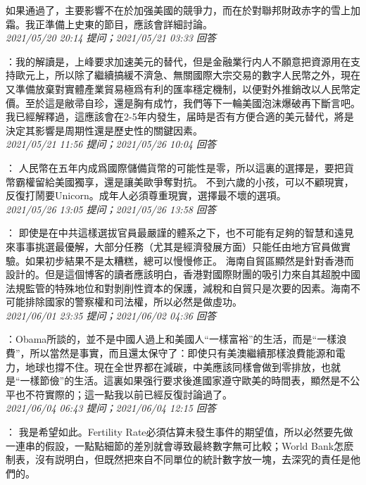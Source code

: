 \documentclass[twocolumn]{ctexart}
\begin{document}
如果通過了，主要影響不在於加强美國的競爭力，而在於對聯邦財政赤字的雪上加霜。我正準備上史東的節目，應該會詳細討論。
\\

\textit{\hfill\noindent\small 2021/05/20 20:14 提问；2021/05/21 03:33 回答}

：我的解讀是，上峰要求加速美元的替代，但是金融業行内人不願意把資源用在支持歐元上，所以除了繼續搞緩不濟急、無關國際大宗交易的數字人民幣之外，現在又準備放棄對實體產業貿易極爲有利的匯率穩定機制，以便對外推銷改以人民幣定價。至於這是敝帚自珍，還是胸有成竹，我們等下一輪美國泡沫爆破再下斷言吧。我已經解釋過，這應該會在2-5年内發生，届時是否有方便合適的美元替代，將是決定其影響是周期性還是歷史性的關鍵因素。
\\

\textit{\hfill\noindent\small 2021/05/21 11:56 提问；2021/05/26 10:04 回答}

：
人民幣在五年内成爲國際儲備貨幣的可能性是零，所以這裏的選擇是，要把貨幣霸權留給美國獨享，還是讓美歐爭奪對抗。
不到六歲的小孩，可以不顧現實，反復打鬧要Unicorn。成年人必須尊重現實，選擇最不壞的選項。
\\

\textit{\hfill\noindent\small 2021/05/26 13:05 提问；2021/05/26 13:58 回答}

：
即使是在中共這樣選拔官員最嚴謹的體系之下，也不可能有足夠的智慧和遠見來事事挑選最優解，大部分任務（尤其是經濟發展方面）只能任由地方官員做實驗。如果初步結果不是太糟糕，總可以慢慢修正。
海南自貿區顯然是針對香港而設計的。但是這個博客的讀者應該明白，香港對國際財團的吸引力來自其超脫中國法規監管的特殊地位和對剝削性資本的保護，減稅和自貿只是次要的因素。海南不可能排除國家的警察權和司法權，所以必然是做虛功。
\\

\textit{\hfill\noindent\small 2021/06/01 23:35 提问；2021/06/02 04:36 回答}

：Obama所談的，並不是中國人過上和美國人“一樣富裕”的生活，而是“一樣浪費”，所以當然是事實，而且還太保守了：即使只有美澳繼續那樣浪費能源和電力，地球也撐不住。現在全世界都在減碳，中美應該同樣會做到零排放，也就是“一樣節儉”的生活。這裏如果强行要求後進國家遵守歐美的時間表，顯然是不公平也不符實際的；這一點我以前已經反復討論過了。
\\

\textit{\hfill\noindent\small 2021/06/04 06:43 提问；2021/06/04 12:15 回答}

：
我是希望如此。Fertility Rate必須估算未發生事件的期望值，所以必然要先做一連串的假設，一點點細節的差別就會導致最終數字無可比較；World Bank怎麽制表，沒有説明白，但既然把來自不同單位的統計數字放一塊，去深究的責任是他們的。
\\
\end{document}
